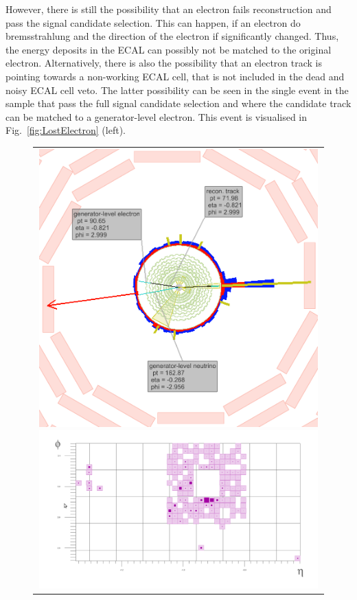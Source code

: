 However, there is still the possibility that an electron fails reconstruction and pass the signal candidate selection.
This can happen, if an electron do bremsstrahlung and the direction of the electron if significantly changed.
Thus, the energy deposits in the ECAL can possibly not be matched to the original electron.
Alternatively, there is also the possibility that an electron track is pointing towards a non-working ECAL cell, that is not included in the dead and noisy ECAL cell veto.
The latter possibility can be seen in the single event in the \WJets sample that pass the full signal candidate selection and where the candidate track can be matched to a generator-level electron. 
This event is visualised in Fig.~\ref{fig:LostElectron} (left). 
\begin{figure}[!t]
  \centering 
  \begin{tabular}{c}
  \begin{minipage}[c]{0.49\textwidth}
  \centering
  \includegraphics[width=0.99\textwidth]{figures/analysis/Background/Electron_lumi_279317_event_111637553.png}
  \end{minipage} 
  \begin{minipage}[c]{0.49\textwidth}
  \centering
  \includegraphics[width=0.99\textwidth]{figures/analysis/Background/TowerDetailViewZoom.png}

\end{minipage}
\end{tabular}
\end{figure}
